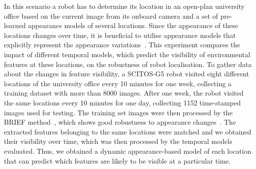 In this scenario a robot has to determine its location in an open-plan university office based on the current image from its onboard camera and a set of pre-learned appearance models of several locations.
Since the appearance of these locations changes over time, it is beneficial to utilise appearance models that explicitly represent the appearance variations~\cite{prediction,fremen,rosen,churchill}.
This experiment compares the impact of different temporal models, which predict the visibility of environmental features at these locations, on the robustness of robot localisation. 
To gather data about the changes in feature visibility, a SCITOS-G5 robot visited eight different locations of the university office every 10 minutes for one week, collecting a training dataset with more than 8000 images.
After one week, the robot visited the same locations every 10 minutes for one day, collecting 1152 time-stamped images used for testing. 
% 
%
The training set images were then processed by the BRIEF method~\cite{brief}, which shows good robustness to appearance changes~\cite{krajnik2016griefras}. 
The extracted features belonging to the same locations were matched and we obtained their visibility over time, which was then processed by the temporal models evaluated.
Thus, we obtained a dynamic appearance-based model of each location that can predict which features are likely to be visible at a particular time.

